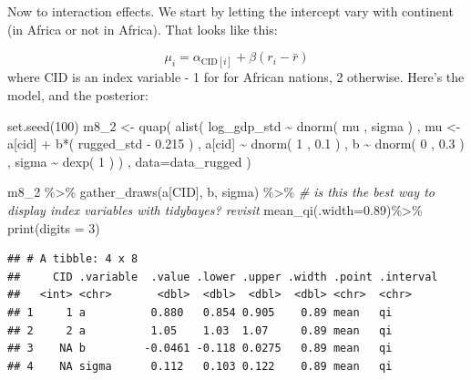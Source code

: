 \documentclass[
]{book}
\newenvironment{Shaded}{\begin{snugshade}}{\end{snugshade}}
\newcommand{\AttributeTok}[1]{\textcolor[rgb]{0.77,0.63,0.00}{#1}}
\newcommand{\CommentTok}[1]{\textcolor[rgb]{0.56,0.35,0.01}{\textit{#1}}}
\newcommand{\DecValTok}[1]{\textcolor[rgb]{0.00,0.00,0.81}{#1}}
\newcommand{\FloatTok}[1]{\textcolor[rgb]{0.00,0.00,0.81}{#1}}
\newcommand{\FunctionTok}[1]{\textcolor[rgb]{0.00,0.00,0.00}{#1}}
\newcommand{\NormalTok}[1]{#1}
\newcommand{\OtherTok}[1]{\textcolor[rgb]{0.56,0.35,0.01}{#1}}
\newcommand{\SpecialCharTok}[1]{\textcolor[rgb]{0.00,0.00,0.00}{#1}}
\begin{document}
Now to interaction effects. We start by letting the intercept vary with continent (in Africa or not in Africa). That looks like this:

\[
\mu_i = \alpha_{\text{CID}[i]} + \beta(r_i - \bar{r})
\]
where CID is an index variable - 1 for for African nations, 2 otherwise. Here's the model, and the posterior:

\begin{Shaded}
\begin{Highlighting}[]
\FunctionTok{set.seed}\NormalTok{(}\DecValTok{100}\NormalTok{)}
\NormalTok{m8\_2 }\OtherTok{\textless{}{-}} \FunctionTok{quap}\NormalTok{( }\FunctionTok{alist}\NormalTok{(}
\NormalTok{log\_gdp\_std }\SpecialCharTok{\textasciitilde{}} \FunctionTok{dnorm}\NormalTok{( mu , sigma ) , }
\NormalTok{mu }\OtherTok{\textless{}{-}}\NormalTok{ a[cid] }\SpecialCharTok{+}\NormalTok{ b}\SpecialCharTok{*}\NormalTok{( rugged\_std }\SpecialCharTok{{-}} \FloatTok{0.215}\NormalTok{ ) , }
\NormalTok{a[cid] }\SpecialCharTok{\textasciitilde{}} \FunctionTok{dnorm}\NormalTok{( }\DecValTok{1}\NormalTok{ , }\FloatTok{0.1}\NormalTok{ ) , }
\NormalTok{b }\SpecialCharTok{\textasciitilde{}} \FunctionTok{dnorm}\NormalTok{( }\DecValTok{0}\NormalTok{ , }\FloatTok{0.3}\NormalTok{ ) , }
\NormalTok{sigma }\SpecialCharTok{\textasciitilde{}} \FunctionTok{dexp}\NormalTok{( }\DecValTok{1}\NormalTok{ )}
\NormalTok{) , }\AttributeTok{data=}\NormalTok{data\_rugged )}

\NormalTok{m8\_2 }\SpecialCharTok{\%\textgreater{}\%}
  \FunctionTok{gather\_draws}\NormalTok{(a[CID], b, sigma) }\SpecialCharTok{\%\textgreater{}\%} \CommentTok{\# is this the best way to display index variables with tidybayes? revisit}
  \FunctionTok{mean\_qi}\NormalTok{(}\AttributeTok{.width=}\FloatTok{0.89}\NormalTok{)}\SpecialCharTok{\%\textgreater{}\%}
  \FunctionTok{print}\NormalTok{(}\AttributeTok{digits =} \DecValTok{3}\NormalTok{)}
\end{Highlighting}
\end{Shaded}

\begin{verbatim}
## # A tibble: 4 x 8
##     CID .variable  .value .lower .upper .width .point .interval
##   <int> <chr>       <dbl>  <dbl>  <dbl>  <dbl> <chr>  <chr>    
## 1     1 a          0.880   0.854 0.905    0.89 mean   qi       
## 2     2 a          1.05    1.03  1.07     0.89 mean   qi       
## 3    NA b         -0.0461 -0.118 0.0275   0.89 mean   qi       
## 4    NA sigma      0.112   0.103 0.122    0.89 mean   qi
\end{verbatim}
\end{document}
